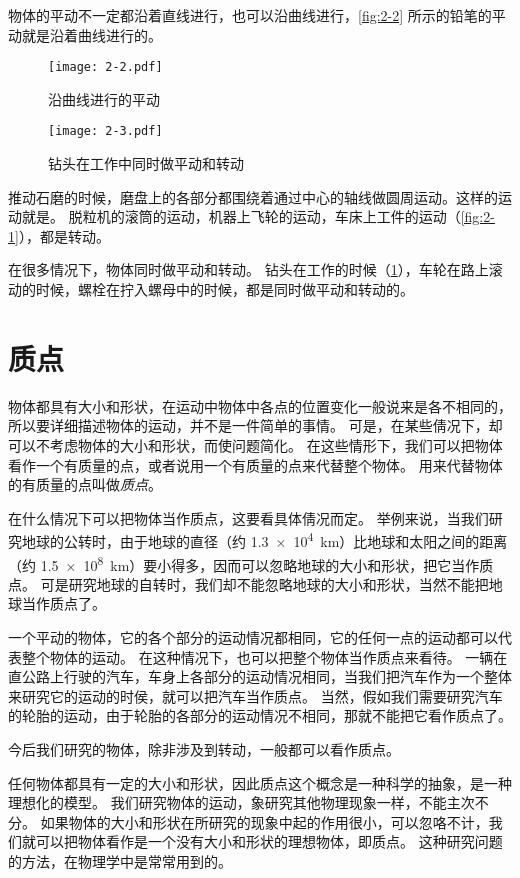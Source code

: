 \medskip
物体的平动不一定都沿着直线进行，也可以沿曲线进行，\cref{fig:2-2} 所示的铅笔的平动就是沿着曲线进行的。
\begin{figure}
\begin{minipage}[b]{0.48\linewidth}\centering
  \texttt{[image: 2-2.pdf]}
  \caption{沿曲线进行的平动}\label{fig:2-2}
\end{minipage}
\begin{minipage}[b]{0.48\linewidth}\centering
  \texttt{[image: 2-3.pdf]}
  \caption{钻头在工作中同时做平动和转动}\label{fig:2-3}
\end{minipage}
\end{figure}

推动石磨的时候，磨盘上的各部分都围绕着通过中心的轴线做圆周运动。这样的运动就是。
脱粒机的滚筒的运动，机器上飞轮的运动，车床上工件的运动（\cref{fig:2-1}），都是转动。

在很多情况下，物体同时做平动和转动。
钻头在工作的时候（\cref{fig:2-3}），车轮在路上滚动的时候，螺栓在拧入螺母中的时候，都是同时做平动和转动的。

\section{质点}
物体都具有大小和形状，在运动中物体中各点的位置变化一般说来是各不相同的，所以要详细描述物体的运动，并不是一件简单的事情。
可是，在某些倩况下，却可以不考虑物体的大小和形状，而使问题简化。
在这些情形下，我们可以把物体看作一个有质量的点，或者说用一个有质量的点来代替整个物体。
用来代替物体的有质量的点叫做\emph{质点}。

在什么情况下可以把物体当作质点，这要看具体倩况而定。
举例来说，当我们研究地球的公转时，由于地球的直径（约 \qty{1.3e4}{km}）比地球和太阳之间的距离（约 \qty{1.5e8}{km}）要小得多，因而可以忽略地球的大小和形状，把它当作质点。
可是研究地球的自转时，我们却不能忽略地球的大小和形状，当然不能把地球当作质点了。

一个平动的物体，它的各个部分的运动情况都相同，它的任何一点的运动都可以代表整个物体的运动。
在这种情况下，也可以把整个物体当作质点来看待。
一辆在直公路上行驶的汽车，车身上各部分的运动情况相同，当我们把汽车作为一个整体来研究它的运动的时侯，就可以把汽车当作质点。
当然，假如我们需要研究汽车的轮胎的运动，由于轮胎的各部分的运动情况不相同，那就不能把它看作质点了。

今后我们研究的物体，除非涉及到转动，一般都可以看作质点。

任何物体都具有一定的大小和形状，因此质点这个概念是一种科学的抽象，是一种理想化的模型。
我们研究物体的运动，象研究其他物理现象一样，不能主次不分。
如果物体的大小和形状在所研究的现象中起的作用很小，可以忽咯不计，我们就可以把物体看作是一个没有大小和形状的理想物体，即质点。
这种研究问题的方法，在物理学中是常常用到的。

